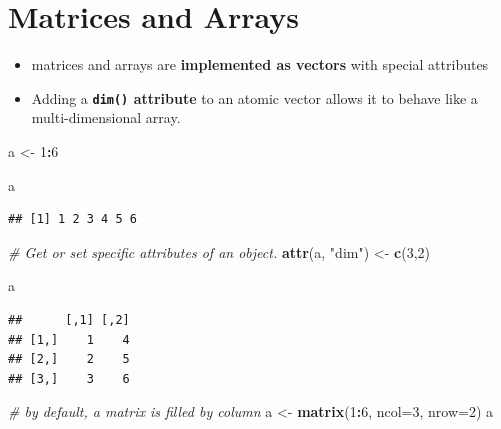 \documentclass[]{book}
\newenvironment{Shaded}{\begin{snugshade}}{\end{snugshade}}
\newcommand{\CommentTok}[1]{\textcolor[rgb]{0.56,0.35,0.01}{\textit{#1}}}
\newcommand{\DataTypeTok}[1]{\textcolor[rgb]{0.13,0.29,0.53}{#1}}
\newcommand{\DecValTok}[1]{\textcolor[rgb]{0.00,0.00,0.81}{#1}}
\newcommand{\KeywordTok}[1]{\textcolor[rgb]{0.13,0.29,0.53}{\textbf{#1}}}
\newcommand{\NormalTok}[1]{#1}
\newcommand{\OperatorTok}[1]{\textcolor[rgb]{0.81,0.36,0.00}{\textbf{#1}}}
\newcommand{\StringTok}[1]{\textcolor[rgb]{0.31,0.60,0.02}{#1}}
\providecommand{\tightlist}{%
  \setlength{\itemsep}{0pt}\setlength{\parskip}{0pt}}
\begin{document}
\hypertarget{matrices-and-arrays}{%
\section{Matrices and Arrays}\label{matrices-and-arrays}}

\begin{itemize}
\tightlist
\item
  matrices and arrays are \textbf{implemented as vectors} with special attributes
\item
  Adding a \textbf{\texttt{dim()} attribute} to an atomic vector allows it to behave like a multi-dimensional array.
\end{itemize}

\begin{Shaded}
\begin{Highlighting}[]
\NormalTok{a <-}\StringTok{ }\DecValTok{1}\OperatorTok{:}\DecValTok{6}
\end{Highlighting}
\end{Shaded}

\begin{Shaded}
\begin{Highlighting}[]
\NormalTok{a}
\end{Highlighting}
\end{Shaded}

\begin{verbatim}
## [1] 1 2 3 4 5 6
\end{verbatim}

\begin{Shaded}
\begin{Highlighting}[]
\CommentTok{# Get or set specific attributes of an object.}
\KeywordTok{attr}\NormalTok{(a, }\StringTok{"dim"}\NormalTok{) <-}\StringTok{ }\KeywordTok{c}\NormalTok{(}\DecValTok{3}\NormalTok{,}\DecValTok{2}\NormalTok{)}
\end{Highlighting}
\end{Shaded}

\begin{Shaded}
\begin{Highlighting}[]
\NormalTok{a}
\end{Highlighting}
\end{Shaded}

\begin{verbatim}
##      [,1] [,2]
## [1,]    1    4
## [2,]    2    5
## [3,]    3    6
\end{verbatim}

\begin{Shaded}
\begin{Highlighting}[]
\CommentTok{# by default, a matrix is filled by column}
\NormalTok{a <-}\StringTok{ }\KeywordTok{matrix}\NormalTok{(}\DecValTok{1}\OperatorTok{:}\DecValTok{6}\NormalTok{, }\DataTypeTok{ncol=}\DecValTok{3}\NormalTok{, }\DataTypeTok{nrow=}\DecValTok{2}\NormalTok{)}
\NormalTok{a}
\end{Highlighting}
\end{Shaded}
\end{document}
